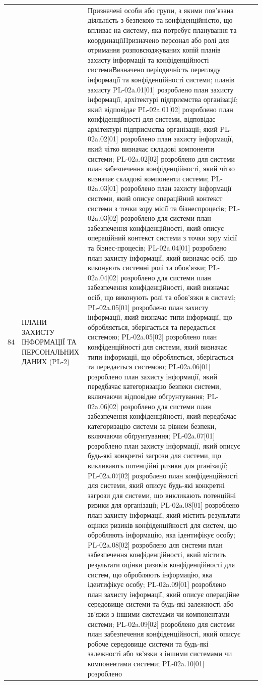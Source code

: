 \documentclass[10pt]{article}
\begin{document}
\begin{longtable}{|c|>{\raggedright\arraybackslash}p{4cm}|>{\raggedright\arraybackslash}p{6cm}|>{\raggedright\arraybackslash}p{2cm}|>{\raggedright\arraybackslash}p{4cm}|}
84 & ПЛАНИ ЗАХИСТУ ІНФОРМАЦІЇ ТА ПЕРСОНАЛЬНИХ ДАНИХ (PL-2) & Призначені особи або групи, з якими пов'язана діяльність з безпекою та конфіденційністю, що впливає на систему, яка потребує планування та координації\newline Призначено персонал або ролі для отримання розповсюджуваних копій планів захисту інформації та конфіденційності системи\newline Визначено періодичність перегляду інформації та конфіденційності системи; планів захисту PL-02a.01[01] розроблено план захисту інформації, архітектурі підприємства організації; який відповідає PL-02a.01[02] розроблено план конфіденційності для системи, відповідає архітектурі підприємства організації; який PL-02a.02[01] розроблено план захисту інформації, який чітко визначає складові компоненти системи; PL-02a.02[02] розроблено для системи план забезпечення конфіденційності, який чітко визначає складові компоненти системи; PL-02a.03[01] розроблено план захисту інформації системи, який описує операційний контекст системи з точки зору місії та бізнеспроцесів; PL-02a.03[02] розроблено для системи план забезпечення конфіденційності, який описує операційний контекст системи з точки зору місії та бізнес-процесів; PL-02a.04[01] розроблено план захисту інформації, який визначає осіб, що виконують системні ролі та обов'язки; PL-02a.04[02] розроблено для системи план забезпечення конфіденційності, який визначає осіб, що виконують ролі та обов'язки в системі; PL-02a.05[01] розроблено план захисту інформації, який визначає типи інформації, що обробляється, зберігається та передається системою; PL-02a.05[02] розроблено план конфіденційності для системи, який визначає типи інформації, що обробляється, зберігається та передається системою; PL-02a.06[01] розроблено план захисту інформації, який передбачає категоризацію безпеки системи, включаючи відповідне обґрунтування; PL-02a.06[02] розроблено для системи план забезпечення конфіденційності, який передбачає категоризацію системи за рівнем безпеки, включаючи обґрунтування; PL-02a.07[01] розроблено план захисту інформації, який описує будь-які конкретні загрози для системи, що викликають потенційні ризики для рганізації; PL-02a.07[02] розроблено план конфіденційності для системи, який описує будь-які конкретні загрози для системи, що викликають потенційні ризики для організації; PL-02a.08[01] розроблено план захисту інформації, який містить результати оцінки ризиків конфіденційності для систем, що обробляють інформацію, яка ідентифікує особу; PL-02a.08[02] розроблено для системи план забезпечення конфіденційності, який містить результати оцінки ризиків конфіденційності для систем, що обробляють інформацію, яка ідентифікує особу; PL-02a.09[01] розроблено план захисту інформації, який описує операційне середовище системи та будь-які залежності або зв'язки з іншими системами чи компонентами системи; PL-02a.09[02] розроблено для системи план забезпечення конфіденційності, який описує робоче середовище системи та будь-які залежності або зв'язки з іншими системами чи компонентами системи; PL-02a.10[01] розроблено 
\end{longtable}
\end{document}
